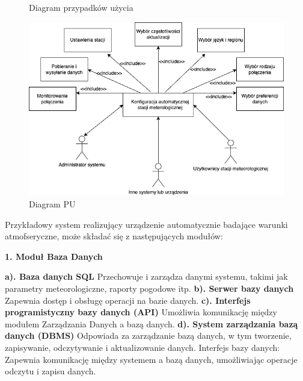 \documentclass{article}
\begin{document}
\begin{center}
    \begin{figure}
        \centering
        \begin{minipage}{0.6\textwidth}
            \centering
            \large Diagram przypadków użycia
        \end{minipage}
        \includegraphics[scale=0.5]{pu.png}
        \caption{Diagram PU}
        \label{etykieta11}
    \end{figure}
    \newpage

    \large Przykładowy system realizujący urządzenie automatycznie badające warunki atmofseryczne, może składać się z następujących modułów: \newline \newline
    \begin{center}
        \textbf{1. Moduł Baza Danych} 
    \end{center}
    \begin{flushleft}
        \textbf{a). Baza danych SQL} Przechowuje i zarządza danymi systemu, takimi jak parametry meteorologiczne, raporty pogodowe itp. \newline
        \textbf{b). Serwer bazy danych} Zapewnia dostęp i obsługę operacji na bazie danych. \newline
        \textbf{c). Interfejs programistyczny bazy danych (API)} Umożliwia komunikację między modułem Zarządzania Danych a bazą danych. \newline
        \textbf{d). System zarządzania bazą danych (DBMS)} Odpowiada za zarządzanie bazą danych, w tym tworzenie, zapisywanie, odczytywanie i aktualizowanie danych.
        Interfejs bazy danych: Zapewnia komunikację między systemem a bazą danych, umożliwiając operacje odczytu i zapisu danych. \newline
    \end{flushleft}
\end{center}
\end{document}
